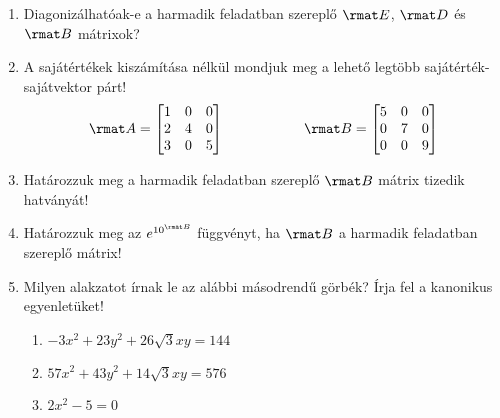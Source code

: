 \documentclass[a4paper, 12pt]{scrartcl}
\begin{document}
\begin{enumerate}
  \item Diagonizálhatóak-e a harmadik feladatban szereplő $\rmat E$, $\rmat D$
        és $\rmat B$ mátrixok?

  \item A sajátértékek kiszámítása nélkül mondjuk meg a lehető legtöbb
        sajátér\-ték-sa\-ját\-vek\-tor párt!
        $$
          \rmat A =
          \begin{bmatrix}
            1 & 0 & 0 \\
            2 & 4 & 0 \\
            3 & 0 & 5
          \end{bmatrix}
          \hspace{2cm}
          \rmat B =
          \begin{bmatrix}
            5 & 0 & 0 \\
            0 & 7 & 0 \\
            0 & 0 & 9
          \end{bmatrix}
        $$

  \item Határozzuk meg a harmadik feladatban szereplő $\rmat B$ mátrix tizedik
        hatványát!

  \item Határozzuk meg az $e^{10^{\rmat B}}$ függvényt, ha $\rmat B$ a harmadik
        feladatban szereplő mátrix!

  \item Milyen alakzatot írnak le az alábbi másodrendű görbék?
        Írja fel a kanonikus egyenletüket!
        \begin{enumerate}
          \item $
                  -3x^2 + 23y^2 + 26\sqrt{3}xy = 144
                $

          \item $
                  57x^2 + 43y^2 + 14\sqrt{3}xy = 576
                $

          \item $
                  2x^2 - 5 = 0
                $
        \end{enumerate}
\end{enumerate}
\end{document}
